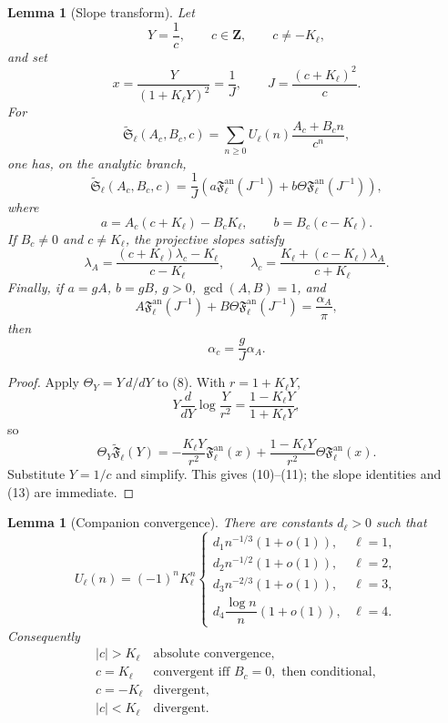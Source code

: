 \documentclass[11pt,a4paper]{amsart} %
\newtheorem{lemma}[theorem]{Lemma}
\theoremstyle{definition}
\begin{document}
\begin{lemma}[Slope transform]\label{lem:companionslope}
Let
\[
Y=\frac1c,\qquad c\in\mathbf Z,\qquad c\ne-K_\ell,
\]
and set
\[
x=\frac{Y}{(1+K_\ell Y)^2}=\frac1J,
\qquad
J=\frac{(c+K_\ell)^2}{c}.
\tag{9}
\]
For
\[
\widetilde{\mathfrak S}_\ell(A_c,B_c,c)
=
\sum_{n\ge0}U_\ell(n)\frac{A_c+B_cn}{c^n},
\]
one has, on the analytic branch,
\[
\widetilde{\mathfrak S}_\ell(A_c,B_c,c)
=
\frac1J
\left(
a{\mathfrak F}^{\mathrm{an}}_\ell(J^{-1})
+b\Theta{\mathfrak F}^{\mathrm{an}}_\ell(J^{-1})
\right),
\tag{10}
\]
where
\[
a=A_c(c+K_\ell)-B_cK_\ell,
\qquad
b=B_c(c-K_\ell).
\tag{11}
\]
If \(B_c\ne0\) and \(c\ne K_\ell\), the projective slopes satisfy
\[
\lambda_A
=
\frac{(c+K_\ell)\lambda_c-K_\ell}{c-K_\ell},
\qquad
\lambda_c
=
\frac{K_\ell+(c-K_\ell)\lambda_A}{c+K_\ell}.
\tag{12}
\]
Finally, if \(a=gA\), \(b=gB\), \(g>0\), \(\gcd(A,B)=1\), and
\[
A{\mathfrak F}^{\mathrm{an}}_\ell(J^{-1})
+B\Theta{\mathfrak F}^{\mathrm{an}}_\ell(J^{-1})
=\frac{\alpha_A}{\pi},
\]
then
\[
\alpha_c=\frac{g}{J}\alpha_A.
\tag{13}
\]
\end{lemma}

\begin{proof}
Apply \(\Theta_Y=Y\,d/dY\) to (8). With \(r=1+K_\ell Y\),
\[
Y\frac{d}{dY}\log\frac{Y}{r^2}
=
\frac{1-K_\ell Y}{1+K_\ell Y},
\]
so
\[
\Theta_Y\widetilde{\mathfrak F}_\ell(Y)
=
-\frac{K_\ell Y}{r^2}{\mathfrak F}^{\mathrm{an}}_\ell(x)
+\frac{1-K_\ell Y}{r^2}
\Theta{\mathfrak F}^{\mathrm{an}}_\ell(x).
\]
Substitute \(Y=1/c\) and simplify. This gives (10)--(11); the slope
identities and (13) are immediate.
\end{proof}

\begin{lemma}[Companion convergence]\label{lem:compconv}
There are constants \(d_\ell>0\) such that
\[
U_\ell(n)=(-1)^nK_\ell^n
\begin{cases}
d_1n^{-1/3}(1+o(1)),&\ell=1,\\
d_2n^{-1/2}(1+o(1)),&\ell=2,\\
d_3n^{-2/3}(1+o(1)),&\ell=3,\\
d_4\dfrac{\log n}{n}(1+o(1)),&\ell=4.
\end{cases}
\tag{14}
\]
Consequently
\[
\begin{array}{c|c}
|c|>K_\ell&\text{absolute convergence},\\
c=K_\ell&\text{convergent iff }B_c=0,\text{ then conditional},\\
c=-K_\ell&\text{divergent},\\
|c|<K_\ell&\text{divergent}.
\end{array}
\tag{15}
\]
\end{lemma}
\end{document}
